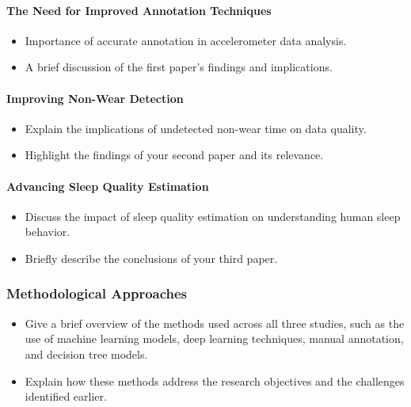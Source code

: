 \documentclass[
  10pt,
  letterpaper,
  DIV=11,
  numbers=noendperiod]{scrartcl}
\let\oldparagraph\paragraph
\renewcommand{\paragraph}[1]{\oldparagraph{#1}\mbox{}}
\providecommand{\tightlist}{%
  \setlength{\itemsep}{0pt}\setlength{\parskip}{0pt}}\usepackage{longtable,booktabs,array}
\begin{document}
\hypertarget{the-need-for-improved-annotation-techniques}{%
\paragraph{The Need for Improved Annotation
Techniques}\label{the-need-for-improved-annotation-techniques}}

\begin{itemize}
\tightlist
\item
  Importance of accurate annotation in accelerometer data analysis.
\item
  A brief discussion of the first paper's findings and implications.
\end{itemize}

\hypertarget{improving-non-wear-detection}{%
\paragraph{Improving Non-Wear
Detection}\label{improving-non-wear-detection}}

\begin{itemize}
\tightlist
\item
  Explain the implications of undetected non-wear time on data quality.
\item
  Highlight the findings of your second paper and its relevance.
\end{itemize}

\hypertarget{advancing-sleep-quality-estimation}{%
\paragraph{Advancing Sleep Quality
Estimation}\label{advancing-sleep-quality-estimation}}

\begin{itemize}
\tightlist
\item
  Discuss the impact of sleep quality estimation on understanding human
  sleep behavior.
\item
  Briefly describe the conclusions of your third paper.
\end{itemize}

\hypertarget{methodological-approaches}{%
\subsubsection{Methodological
Approaches}\label{methodological-approaches}}

\begin{itemize}
\item
  Give a brief overview of the methods used across all three studies,
  such as the use of machine learning models, deep learning techniques,
  manual annotation, and decision tree models.
\item
  Explain how these methods address the research objectives and the
  challenges identified earlier.
\end{itemize}
\end{document}

